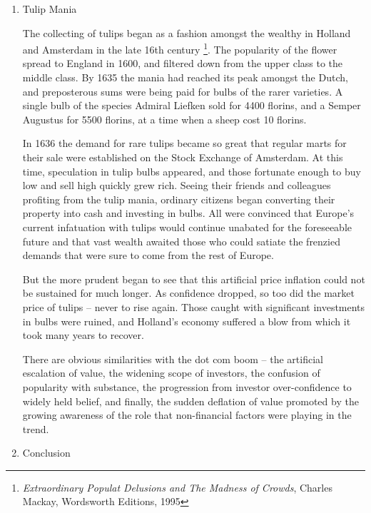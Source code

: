 \documentclass{article}
\begin{document}
\begin{enumerate}
\item Tulip Mania
\label{sec:orgheadline401}

The collecting of tulips began as a fashion amongst the wealthy in
Holland and Amsterdam in the late 16th century \footnote{\emph{Extraordinary Populat Delusions and The Madness of Crowds},
Charles Mackay, Wordsworth Editions, 1995}. The popularity of
the flower spread to England in 1600, and filtered down from the upper
class to the middle class. By 1635 the mania had reached its peak
amongst the Dutch, and preposterous sums were being paid for bulbs of
the rarer varieties. A single bulb of the species Admiral Liefken sold
for 4400 florins, and a Semper Augustus for 5500 florins, at a time when
a sheep cost 10 florins.

In 1636 the demand for rare tulips became so great that regular marts
for their sale were established on the Stock Exchange of Amsterdam. At
this time, speculation in tulip bulbs appeared, and those fortunate
enough to buy low and sell high quickly grew rich. Seeing their friends
and colleagues profiting from the tulip mania, ordinary citizens began
converting their property into cash and investing in bulbs. All were
convinced that Europe's current infatuation with tulips would continue
unabated for the foreseeable future and that vast wealth awaited those
who could satiate the frenzied demands that were sure to come from the
rest of Europe.

But the more prudent began to see that this artificial price inflation
could not be sustained for much longer. As confidence dropped, so too
did the market price of tulips -- never to rise again. Those caught with
significant investments in bulbs were ruined, and Holland's economy
suffered a blow from which it took many years to recover.

There are obvious similarities with the dot com boom -- the artificial
escalation of value, the widening scope of investors, the confusion of
popularity with substance, the progression from investor over-confidence
to widely held belief, and finally, the sudden deflation of value
promoted by the growing awareness of the role that non-financial factors
were playing in the trend.

\item Conclusion
\label{sec:orgheadline402}


\end{enumerate}
\end{document}
